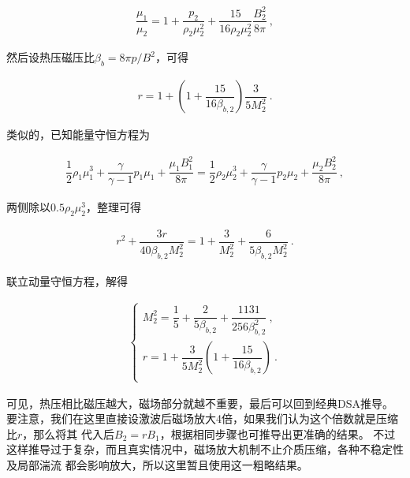\begin{equation}
    \begin{aligned}
      \dfrac{\mu_1}{\mu_2} = 1+\dfrac{p_2}{\rho_2\mu_2^2}+
      \dfrac{15}{16\rho_2\mu_2^2}\dfrac{B_2^2}{8\pi }\ ,
    \end{aligned}
\end{equation}

然后设热压磁压比$\beta_b=8\pi p/B^2$，可得

\begin{equation}
    \begin{aligned}
      r = 1+
      \left(1+\dfrac{15}{16\beta_{b,2}}\right)\dfrac{3}{5 M_2^2} \ .
    \end{aligned}
\end{equation}

类似的，已知能量守恒方程为

\begin{equation}
    \begin{aligned}
      \dfrac{1}{2}\rho_1\mu_1^3+\dfrac{\gamma}{\gamma-1}p_1\mu_1+\dfrac{\mu_1B_1^2}{8\pi}=
      \dfrac{1}{2}\rho_2\mu_2^3+\dfrac{\gamma}{\gamma-1}p_2\mu_2+\dfrac{\mu_2B_2^2}{8\pi}\ ,
    \end{aligned}
\end{equation}

两侧除以$0.5\rho_2\mu_2^3$，整理可得

\begin{equation}
    \begin{aligned}
      r^2 + \dfrac{3r}{40\beta_{b,2}M_2^2} = 1 + \dfrac{3}{M_2^2}
      +\dfrac{6}{5\beta_{b,2} M_2^2} \ .
    \end{aligned}
\end{equation}

联立动量守恒方程，解得

\begin{equation}
      \label{eqn:ratio}
    \begin{aligned}
        \begin{cases}
          M_2^2 = \dfrac{1}{5}+\dfrac{2}{5\beta_{b,2}}+\dfrac{1131}{256\beta_{b,2}^2} \ , \\

          r = 1 + \dfrac{3}{5M_2^2}\left(1+\dfrac{15}{16\beta_{b,2}}\right) \ . \\
        \end{cases}
    \end{aligned}
\end{equation}

可见，热压相比磁压越大，磁场部分就越不重要，最后可以回到经典DSA推导。
要注意，我们在这里直接设激波后磁场放大4倍，如果我们认为这个倍数就是压缩比$r$，那么将其
代入后$B_2=rB_1$，根据相同步骤也可推导出更准确的结果。
不过这样推导过于复杂，而且真实情况中，磁场放大机制不止介质压缩，各种不稳定性及局部湍流
都会影响放大，所以这里暂且使用这一粗略结果。

